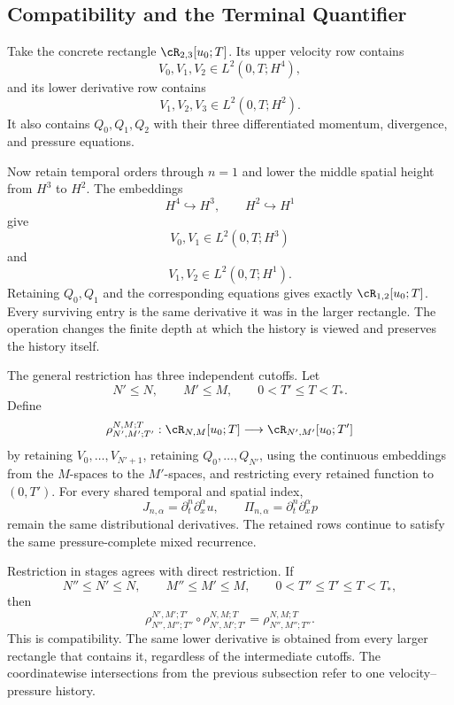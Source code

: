 
\subsection{Compatibility and the Terminal Quantifier}\label{sub:CompatibilityAndTheTerminalQuantifier}

Take the concrete rectangle \(\cR_{2,3}[u_0;T]\).
Its upper velocity row contains
\[
  V_0,V_1,V_2
  \in
  L^2(0,T;H^4),
\]
and its lower derivative row contains
\[
  V_1,V_2,V_3
  \in
  L^2(0,T;H^2).
\]
It also contains \(Q_0,Q_1,Q_2\) with their three differentiated momentum, divergence, and pressure equations.

Now retain temporal orders through \(n=1\) and lower the middle spatial height from \(H^3\) to \(H^2\).
The embeddings
\[
  H^4\hookrightarrow H^3,
  \qquad
  H^2\hookrightarrow H^1
\]
give
\[
  V_0,V_1
  \in
  L^2(0,T;H^3)
\]
and
\[
  V_1,V_2
  \in
  L^2(0,T;H^1).
\]
Retaining \(Q_0,Q_1\) and the corresponding equations gives exactly \(\cR_{1,2}[u_0;T]\).
Every surviving entry is the same derivative it was in the larger rectangle.
The operation changes the finite depth at which the history is viewed and preserves the history itself.

The general restriction has three independent cutoffs.
Let
\[
  N'\leq N,
  \qquad
  M'\leq M,
  \qquad
  0<T'\leq T<T_*.
\]
Define
\[
  \rho_{N',M';T'}^{N,M;T}:
  \cR_{N,M}[u_0;T]
  \longrightarrow
  \cR_{N',M'}[u_0;T']
\]
by retaining \(V_0,\ldots,V_{N'+1}\), retaining \(Q_0,\ldots,Q_{N'}\), using the continuous embeddings from the \(M\)-spaces to the \(M'\)-spaces, and restricting every retained function to \((0,T')\).
For every shared temporal and spatial index,
\[
  J_{n,\alpha}
  =
  \partial_t^n\partial_x^\alpha u,
  \qquad
  \Pi_{n,\alpha}
  =
  \partial_t^n\partial_x^\alpha p
\]
remain the same distributional derivatives.
The retained rows continue to satisfy the same pressure-complete mixed recurrence.

Restriction in stages agrees with direct restriction.
If
\[
  N''\leq N'\leq N,
  \qquad
  M''\leq M'\leq M,
  \qquad
  0<T''\leq T'\leq T<T_*,
\]
then
\[
  \rho_{N'',M'';T''}^{N',M';T'}
  \circ
  \rho_{N',M';T'}^{N,M;T}
  =
  \rho_{N'',M'';T''}^{N,M;T}.
\]
This is compatibility.
The same lower derivative is obtained from every larger rectangle that contains it, regardless of the intermediate cutoffs.
The coordinatewise intersections from the previous subsection refer to one velocity--pressure history.

